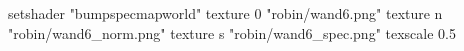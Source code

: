 setshader "bumpspecmapworld"
   texture 0 "robin/wand6.png"
   texture n "robin/wand6_norm.png"
   texture s "robin/wand6_spec.png"
texscale 0.5